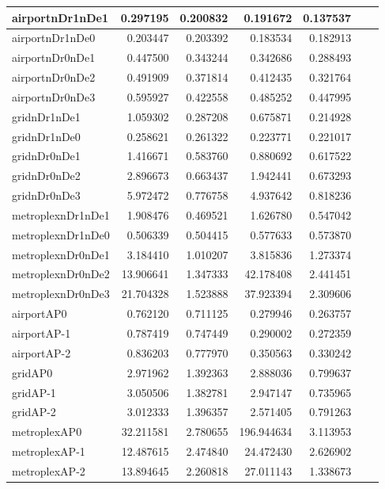 \begin{longtable}{|l|r|r|r|r|r|r|}
\endlastfoot
airportnDr1nDe1 & 0.297195 & 0.200832 & 0.191672 & 0.137537 \\ \hline
airportnDr1nDe0 & 0.203447 & 0.203392 & 0.183534 & 0.182913 \\ \hline
airportnDr0nDe1 & 0.447500 & 0.343244 & 0.342686 & 0.288493 \\ \hline
airportnDr0nDe2 & 0.491909 & 0.371814 & 0.412435 & 0.321764 \\ \hline
airportnDr0nDe3 & 0.595927 & 0.422558 & 0.485252 & 0.447995 \\ \hline
gridnDr1nDe1 & 1.059302 & 0.287208 & 0.675871 & 0.214928 \\ \hline
gridnDr1nDe0 & 0.258621 & 0.261322 & 0.223771 & 0.221017 \\ \hline
gridnDr0nDe1 & 1.416671 & 0.583760 & 0.880692 & 0.617522 \\ \hline
gridnDr0nDe2 & 2.896673 & 0.663437 & 1.942441 & 0.673293 \\ \hline
gridnDr0nDe3 & 5.972472 & 0.776758 & 4.937642 & 0.818236 \\ \hline
metroplexnDr1nDe1 & 1.908476 & 0.469521 & 1.626780 & 0.547042 \\ \hline
metroplexnDr1nDe0 & 0.506339 & 0.504415 & 0.577633 & 0.573870 \\ \hline
metroplexnDr0nDe1 & 3.184410 & 1.010207 & 3.815836 & 1.273374 \\ \hline
metroplexnDr0nDe2 & 13.906641 & 1.347333 & 42.178408 & 2.441451 \\ \hline
metroplexnDr0nDe3 & 21.704328 & 1.523888 & 37.923394 & 2.309606 \\ \hline
airportAP0 & 0.762120 & 0.711125 & 0.279946 & 0.263757 \\ \hline
airportAP-1 & 0.787419 & 0.747449 & 0.290002 & 0.272359 \\ \hline
airportAP-2 & 0.836203 & 0.777970 & 0.350563 & 0.330242 \\ \hline
gridAP0 & 2.971962 & 1.392363 & 2.888036 & 0.799637 \\ \hline
gridAP-1 & 3.050506 & 1.382781 & 2.947147 & 0.735965 \\ \hline
gridAP-2 & 3.012333 & 1.396357 & 2.571405 & 0.791263 \\ \hline
metroplexAP0 & 32.211581 & 2.780655 & 196.944634 & 3.113953 \\ \hline
metroplexAP-1 & 12.487615 & 2.474840 & 24.472430 & 2.626902 \\ \hline
metroplexAP-2 & 13.894645 & 2.260818 & 27.011143 & 1.338673 \\ \hline

\end{longtable}

